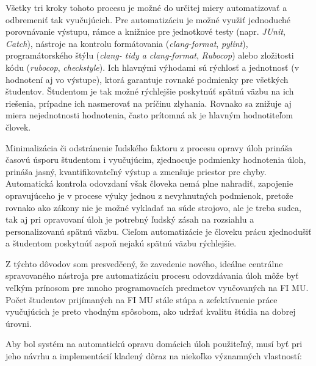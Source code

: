 \documentclass[
  digital, %
  twoside, %
  table,   %
  lof,     %
  lot,     %
]{fithesis3}
\begin{document}
Všetky tri kroky tohoto procesu je možné do určitej miery automatizovať a odbremeniť tak vyučujúcich. Pre automatizáciu je možné využiť jednoduché porovnávanie výstupu, rámce a knižnice pre jednotkové testy (napr. \textit{JUnit}, \textit{Catch}), nástroje na kontrolu formátovania (\textit{clang-format}, \textit{pylint}), programátorského štýlu (\textit{clang- tidy a clang-format}, \textit{Rubocop}) alebo zložitosti kódu (\textit{rubocop}, \textit{checkstyle}). Ich hlavnými výhodami sú rýchlosť a jednotnosť (v hodnotení aj vo výstupe), ktorá garantuje rovnaké podmienky pre všetkých študentov. Študentom je tak možné rýchlejšie poskytnúť spätnú väzbu na ich riešenia, prípadne ich nasmerovať na príčinu zlyhania. Rovnako sa znižuje aj miera nejednotnosti hodnotenia, často prítomná ak je hlavným hodnotiteľom človek.

Minimalizácia či odstránenie ľudského faktoru z procesu opravy úloh prináša časovú úsporu študentom i vyučujúcim, zjednocuje podmienky hodnotenia úloh, prináša jasný, kvantifikovateľný výstup a zmenšuje priestor pre chyby. Automatická kontrola odovzdaní však človeka nemá plne nahradiť, zapojenie opravujúceho je v procese výuky jednou z nevyhnutných podmienok, pretože rovnako ako zákony nie je možné vykladať na súde strojovo, ale je treba sudca, tak aj pri opravovaní úloh je potrebný ľudský zásah na rozsiahlu a personalizovanú spätnú väzbu. Cieľom automatizácie je človeku prácu zjednodušiť a študentom poskytnúť aspoň nejakú spätnú väzbu rýchlejšie.

Z týchto dôvodov som presvedčený, že zavedenie nového, ideálne centrálne spravovaného nástroja pre automatizáciu procesu odovzdávania úloh môže byť veľkým prínosom pre mnoho programovacích predmetov vyučovaných na FI MU. Počet študentov prijímaných na FI MU stále stúpa a zefektívnenie práce vyučujúcich je preto vhodným spôsobom, ako udržať kvalitu štúdia na dobrej úrovni.

Aby bol systém na automatickú opravu domácich úloh použiteľný, musí byť pri jeho návrhu a implementácií kladený dôraz na niekoľko významných vlastností:
\end{document}
